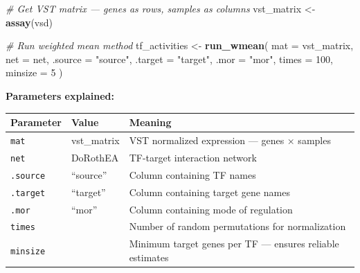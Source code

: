 \documentclass[
]{article}
\newenvironment{Shaded}{\begin{snugshade}}{\end{snugshade}}
\newcommand{\AttributeTok}[1]{\textcolor[rgb]{0.13,0.29,0.53}{#1}}
\newcommand{\CommentTok}[1]{\textcolor[rgb]{0.56,0.35,0.01}{\textit{#1}}}
\newcommand{\DecValTok}[1]{\textcolor[rgb]{0.00,0.00,0.81}{#1}}
\newcommand{\FunctionTok}[1]{\textcolor[rgb]{0.13,0.29,0.53}{\textbf{#1}}}
\newcommand{\NormalTok}[1]{#1}
\newcommand{\OtherTok}[1]{\textcolor[rgb]{0.56,0.35,0.01}{#1}}
\newcommand{\StringTok}[1]{\textcolor[rgb]{0.31,0.60,0.02}{#1}}
\begin{document}
\begin{Shaded}
\begin{Highlighting}[]
\CommentTok{\# Get VST matrix — genes as rows, samples as columns}
\NormalTok{vst\_matrix }\OtherTok{\textless{}{-}} \FunctionTok{assay}\NormalTok{(vsd)}

\CommentTok{\# Run weighted mean method}
\NormalTok{tf\_activities }\OtherTok{\textless{}{-}} \FunctionTok{run\_wmean}\NormalTok{(}
    \AttributeTok{mat     =}\NormalTok{ vst\_matrix,}
    \AttributeTok{net     =}\NormalTok{ net,}
    \AttributeTok{.source =} \StringTok{"source"}\NormalTok{,}
    \AttributeTok{.target =} \StringTok{"target"}\NormalTok{,}
    \AttributeTok{.mor    =} \StringTok{"mor"}\NormalTok{,}
    \AttributeTok{times   =} \DecValTok{100}\NormalTok{,}
    \AttributeTok{minsize =} \DecValTok{5}
\NormalTok{)}
\end{Highlighting}
\end{Shaded}

\textbf{Parameters explained:}

\begin{longtable}[]{@{}
  >{\raggedright\arraybackslash}p{}
  >{\raggedright\arraybackslash}p{}
  >{\raggedright\arraybackslash}p{}@{}}
\toprule\noalign{}
\begin{minipage}[b]{\linewidth}\raggedright
Parameter
\end{minipage} & \begin{minipage}[b]{\linewidth}\raggedright
Value
\end{minipage} & \begin{minipage}[b]{\linewidth}\raggedright
Meaning
\end{minipage} \\
\midrule\noalign{}
\endhead
\bottomrule\noalign{}
\endlastfoot
\texttt{mat} & vst\_matrix & VST normalized expression --- genes ×
samples \\
\texttt{net} & DoRothEA & TF-target interaction network \\
\texttt{.source} & ``source'' & Column containing TF names \\
\texttt{.target} & ``target'' & Column containing target gene names \\
\texttt{.mor} & ``mor'' & Column containing mode of regulation \\
\texttt{times} & 100 & Number of random permutations for
normalization \\
\texttt{minsize} & 5 & Minimum target genes per TF --- ensures reliable
estimates \\
\end{longtable}
\end{document}
